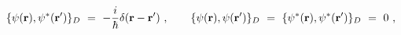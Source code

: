 \begin{equation}
\{\psi ({\bf r}),\psi ^{\ast }({\bf r^{\prime }})\}_{D}\ =\ -{\frac{i}{\hbar 
}}\delta ({\bf r}-{\bf r^{\prime }})\ ,\qquad \{\psi ({\bf r}),\psi ({\bf %
r^{\prime }})\}_{D}\ =\ \{\psi ^{\ast }({\bf r}),\psi ^{\ast }({\bf %
r^{\prime }})\}_{D}\ =\ 0\ ,  \label{DB1}
\end{equation}%
